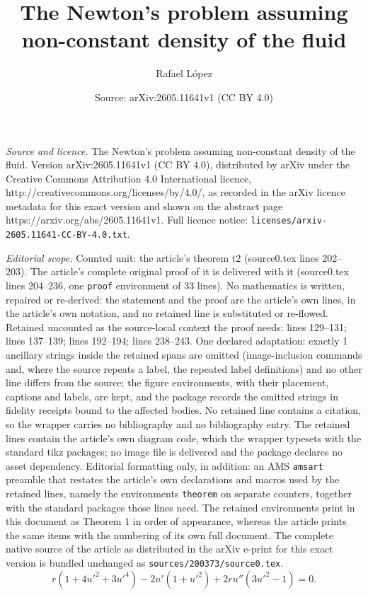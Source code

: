 \documentclass[10pt,a4paper]{amsart}
\title{The Newton's problem assuming non-constant density of the fluid}
\author{Rafael L\'opez}
\date{Source: arXiv:2605.11641v1 (CC BY 4.0)}
\begin{document}
\maketitle

\noindent\emph{Source and licence.} The Newton's problem assuming non-constant density of the fluid. Version arXiv:2605.11641v1 (CC BY 4.0), distributed by arXiv under the Creative Commons Attribution 4.0 International licence, http://creativecommons.org/licenses/by/4.0/, as recorded in the arXiv licence metadata for this exact version and shown on the abstract page https://arxiv.org/abs/2605.11641v1. Full licence notice: \texttt{licenses/arxiv-2605.11641-CC-BY-4.0.txt}.\par\smallskip

\noindent\textit{Editorial scope.} Counted unit: the article's theorem t2 (source0.tex lines 202--203). The article's complete original proof of it is delivered with it (source0.tex lines 204--236, one \texttt{proof} environment of 33 lines). No mathematics is written, repaired or re-derived: the statement and the proof are the article's own lines, in the article's own notation, and no retained line is substituted or re-flowed.  Retained uncounted as the source-local context the proof needs: lines 129--131; lines 137--139; lines 192--194; lines 238--243.  One declared adaptation: exactly 1 ancillary strings inside the retained spans are omitted (image-inclusion commands and, where the source repeats a label, the repeated label definitions) and no other line differs from the source; the figure environments, with their placement, captions and labels, are kept, and the package records the omitted strings in fidelity receipts bound to the affected bodies.  No retained line contains a citation, so the wrapper carries no bibliography and no bibliography entry.  The retained lines contain the article's own diagram code, which the wrapper typesets with the standard tikz packages; no image file is delivered and the package declares no asset dependency.  Editorial formatting only, in addition: an AMS \texttt{amsart} preamble that restates the article's own declarations and macros used by the retained lines, namely the environments \texttt{theorem} on separate counters, together with the standard packages those lines need.  The retained environments print in this document as Theorem 1 in order of appearance, whereas the article prints the same items with the numbering of its own full document.  The complete native source of the article as distributed in the arXiv e-print for this exact version is bundled unchanged as \texttt{sources/200373/source0.tex}.
\begin{equation}\label{ur2}
r \left( 1 + 4 u'^2 + 3 u'^4 \right) - 2 u' \left( 1 + u'^2 \right) + 2 r u'' \left( 3 u'^2 - 1 \right) = 0.
\end{equation}
\end{document}
